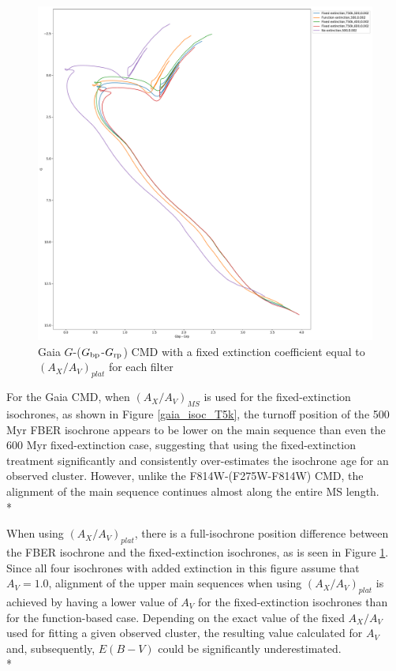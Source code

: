 \documentclass[12pt, a4paper]{report}
\begin{document}
\begin{figure}[h]
\begin{center}
\includegraphics[scale=0.25]{../basti_isochrones_10_13Gyr/Extinction_T50k_FeH0fix_func_G_GbpmGrp_500_400_600_Myr_FeH_0p002_ref_noext_Av_1p0.pdf}
\caption{Gaia $G$-($G_{\textnormal{bp}}$-$G_{\textnormal{rp}}$) CMD with a fixed extinction coefficient equal to $(A_{X}/A_{V})_{plat}$ for each filter}
\label{gaia_isoc_T50k}
\end{center}
\end{figure}

For the Gaia CMD, when $(A_{X}/A_{V})_{MS}$ is used for the fixed-extinction isochrones, as shown in Figure \ref{gaia_isoc_T5k}, the turnoff position of the 500 Myr FBER isochrone appears to be lower on the main sequence than even the 600 Myr fixed-extinction case, suggesting that using the fixed-extinction treatment significantly and consistently over-estimates the isochrone age for an observed cluster. However, unlike the F814W-(F275W-F814W) CMD, the alignment of the main sequence continues almost along the  entire MS length. \\*

When using $(A_{X}/A_{V})_{plat}$, there is a full-isochrone position difference between the FBER isochrone and the fixed-extinction isochrones, as is seen in Figure \ref{gaia_isoc_T50k}. Since all four isochrones with added extinction in this figure assume that $A_{V} = 1.0$, alignment of the upper main sequences when using $(A_{X}/A_{V})_{plat}$ is achieved by having a lower value of $A_{V}$ for the fixed-extinction isochrones than for the function-based case. Depending on the exact value of the fixed $A_{X}/A_{V}$ used for fitting a given observed cluster, the resulting value calculated for $A_{V}$ and, subsequently, $E(B-V)$ could be significantly underestimated. \\*
\end{document}
